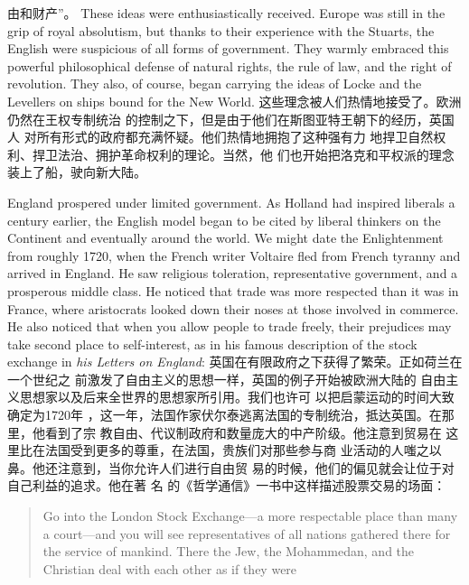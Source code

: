\begin{paracol}{2}
由和财产”。
\switchcolumn*
These ideas were enthusiastically received. Europe was still in
the grip of royal absolutism, but thanks to their experience with
the Stuarts, the English were suspicious of all forms of government. They warmly embraced this powerful philosophical defense of natural rights, the rule of law, and the right of
revolution. They also, of course, began carrying the ideas of
Locke and the Levellers on ships bound for the New World.
\switchcolumn
这些理念被人们热情地接受了。欧洲仍然在王权专制统治
的控制之下，但是由于他们在斯图亚特王朝下的经历，英国人
对所有形式的政府都充满怀疑。他们热情地拥抱了这种强有力
地捍卫自然权利、捍卫法治、拥护革命权利的理论。当然，他
们也开始把洛克和平权派的理念装上了船，驶向新大陆。

England prospered under limited government. As Holland had
inspired liberals a century earlier, the English model began to
be cited by liberal thinkers on the Continent and eventually
around the world. We might date the Enlightenment from
roughly 1720, when the French writer Voltaire fled from French tyranny and arrived in England. He saw religious toleration,
representative government, and a prosperous middle class. He
noticed that trade was more respected than it was in France,
where aristocrats looked down their noses at those involved in
commerce. He also noticed that when you allow people to trade
freely, their prejudices may take second place to self-interest, as
in his famous description of the stock exchange in \textit{his Letters on England}:
\switchcolumn
英国在有限政府之下获得了繁荣。正如荷兰在一个世纪之
前激发了自由主义的思想一样，英国的例子开始被欧洲大陆的
自由主义思想家以及后来全世界的思想家所引用。我们也许可
以把启蒙运动的时间大致确定为1720年 ，这一年，法国作家伏尔泰逃离法国的专制统治，抵达英国。在那里，他看到了宗
教自由、代议制政府和数量庞大的中产阶级。他注意到贸易在
这里比在法国受到更多的尊重，在法国，贵族们对那些参与商
业活动的人嗤之以鼻。他还注意到，当你允许人们进行自由贸
易的时候，他们的偏见就会让位于对自己利益的追求。他在著
名 的《哲学通信》一书中这样描述股票交易的场面：
\switchcolumn*
\begin{quote}
Go into the London Stock Exchange---a more respectable place
than many a court---and you will see representatives of all nations
gathered there for the service of mankind. There the Jew, the Mohammedan, and the Christian deal with each other as if they were

\end{quote}
\end{paracol}

